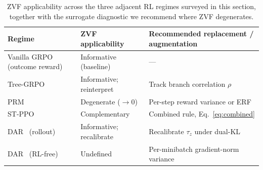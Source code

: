 \begin{table}[h]
\centering
\small
\begin{tabular}{@{}lll@{}}
\toprule
Regime & ZVF applicability & Recommended replacement / augmentation \\
\midrule
Vanilla GRPO (outcome reward) & Informative (baseline)   & --- \\
Tree-GRPO~\cite{treegrpo2025} & Informative; reinterpret & Track branch correlation $\rho$ \\
PRM~\cite{lightman2023prm}    & Degenerate ($\to 0$)     & Per-step reward variance or ERF \\
ST-PPO~\cite{stppo2025}       & Complementary            & Combined rule, Eq.~\eqref{eq:combined} \\
DAR~\cite{dar2024} (rollout)  & Informative; recalibrate & Recalibrate $\tau_z$ under dual-KL \\
DAR~\cite{dar2024} (RL-free)  & Undefined                & Per-minibatch gradient-norm variance \\
\bottomrule
\end{tabular}
\caption{ZVF applicability across the three adjacent RL regimes surveyed in
this section, together with the surrogate diagnostic we recommend where ZVF
degenerates.}
\label{tab:ext:zvf-applicability}
\end{table}

